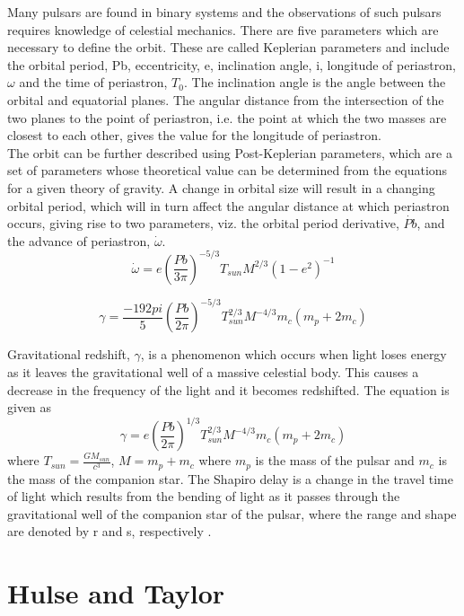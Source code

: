 \documentclass[12pt]{article}
\begin{document}
	Many pulsars are found in binary systems and the observations of such pulsars requires knowledge of celestial mechanics. There are five parameters which are necessary to define the orbit. These are called Keplerian parameters and include the orbital period, Pb, eccentricity, e, inclination angle, i, longitude of periastron, $\omega$ and the time of periastron, $T_0$. The inclination angle is the angle between the orbital and equatorial planes. The angular distance from the intersection of the two planes to the point of periastron, i.e. the point at which the two masses are closest to each other, gives the value for the longitude of periastron.\\
	The orbit can be further described using Post-Keplerian parameters, which are a set of parameters whose theoretical value can be determined from the equations for a given theory of gravity. A change in orbital size will result in a changing orbital period, which will in turn affect the angular distance at which periastron occurs, giving rise to two parameters, viz. the orbital period derivative, $\dot{Pb}$, and the advance of periastron, $\dot{\omega}$. 
	\begin{equation}
	\dot{\omega}=e ({\frac{Pb}{3 \pi}})^{-5/3}{T_{sun}M}^{2/3}({1-e^2})^{-1}
	\end{equation}
	
	\begin{equation}
	\gamma=\frac{-192pi}{5} ({\frac{Pb}{2 \pi}})^{-5/3}T_{sun}^{2/3}M^{-4/3}m_c(m_p+2m_c)
	\end{equation}
	
	Gravitational redshift, $\gamma$, is a phenomenon which occurs when light loses energy as it leaves the gravitational well of a massive celestial body. This causes a decrease in the frequency of the light and it becomes redshifted. The equation is given as
	\begin{equation}\label{grav redshift}
	\gamma=e ({\frac{Pb}{2 \pi}})^{1/3}T_{sun}^{2/3}M^{-4/3}m_c(m_p+2m_c)
	\end{equation}
	where $T_{sun}=\frac{G M_{sun}}{c^3}$, $M=m_p+m_c$ where $m_p$ is the mass of the pulsar and $m_c$ is the mass of the companion star.
	The Shapiro delay is a change in the travel time of light which results from the bending of light as it passes through the gravitational well of the companion star of the pulsar, where the range and shape are denoted by r and s, respectively \cite{iorio2007post}. 
	
	\section{Hulse and Taylor}
	\label{sec:Hulse and Taylor}
	
\end{document}
